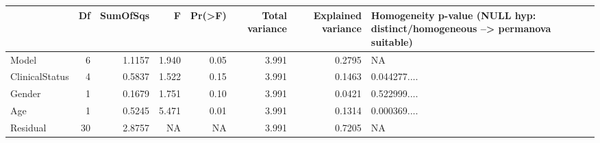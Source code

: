\documentclass[
]{book}
\begin{document}
\begin{tabular}{l|r|r|r|r|r|r|l}
\hline
  & Df & SumOfSqs & F & Pr(>F) & Total variance & Explained variance & Homogeneity p-value (NULL hyp: distinct/homogeneous --> permanova suitable)\\
\hline
Model & 6 & 1.1157 & 1.940 & 0.05 & 3.991 & 0.2795 & NA\\
\hline
ClinicalStatus & 4 & 0.5837 & 1.522 & 0.15 & 3.991 & 0.1463 & 0.044277....\\
\hline
Gender & 1 & 0.1679 & 1.751 & 0.10 & 3.991 & 0.0421 & 0.522999....\\
\hline
Age & 1 & 0.5245 & 5.471 & 0.01 & 3.991 & 0.1314 & 0.000369....\\
\hline
Residual & 30 & 2.8757 & NA & NA & 3.991 & 0.7205 & NA\\
\hline
\end{tabular}
\end{document}
